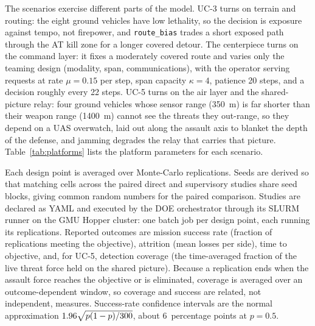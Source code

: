 \documentclass[11pt]{article}
\begin{document}
The scenarios exercise different parts of the model. UC-3 turns on terrain and routing: the eight ground vehicles have low lethality, so the decision is exposure against tempo, not firepower, and \texttt{route\_bias} trades a short exposed path through the AT kill zone for a longer covered detour. The centerpiece turns on the command layer: it fixes a moderately covered route and varies only the teaming design (modality, span, communications), with the operator serving requests at rate $\mu=0.15$ per step, span capacity $\kappa=4$, patience 20 steps, and a decision roughly every 22 steps. UC-5 turns on the air layer and the shared-picture relay: four ground vehicles whose sensor range (350~m) is far shorter than their weapon range (1400~m) cannot see the threats they out-range, so they depend on a UAS overwatch, laid out along the assault axis to blanket the depth of the defense, and jamming degrades the relay that carries that picture. Table~\ref{tab:platforms} lists the platform parameters for each scenario.

\begin{table}[H]
\centering
\caption{Platform parameters per scenario (from the scenario files). Sensor and weapon are detection and engagement ranges; $p_k$ is the base per-opportunity kill probability. Note UC-5's near-blind ground vehicle (sensor 350~m, weapon 1400~m) and its unarmed UAS.}
\label{tab:platforms}

\end{table}

Each design point is averaged over \nRep{} Monte-Carlo replications. Seeds are derived so that matching cells across the paired direct and supervisory studies share seed blocks, giving common random numbers for the paired comparison. Studies are declared as YAML and executed by the DOE orchestrator through its SLURM runner on the GMU Hopper cluster: one batch job per design point, each running its \nRep{} replications. Reported outcomes are mission success rate (fraction of replications meeting the objective), attrition (mean losses per side), time to objective, and, for UC-5, detection coverage (the time-averaged fraction of the live threat force held on the shared picture). Because a replication ends when the assault force reaches the objective or is eliminated, coverage is averaged over an outcome-dependent window, so coverage and success are related, not independent, measures. Success-rate confidence intervals are the normal approximation $1.96\sqrt{p(1-p)/300{}}$, about 6~percentage points at $p=0.5$.
\end{document}

